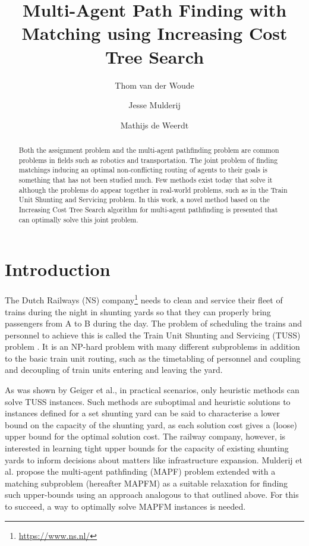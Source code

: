 \documentclass[english]{article}
\begin{document}
	
	\title{Multi-Agent Path Finding with Matching using Increasing Cost Tree Search}
	
	\author{Thom van der Woude\and Jesse Mulderij\and Mathijs de Weerdt}
	\date{}
	
	\maketitle
	
	\begin{abstract}
		Both the assignment problem and the multi-agent pathfinding problem are common problems in fields such as robotics and transportation. The joint problem of finding matchings inducing an optimal non-conflicting routing of agents to their goals is something that has not been studied much. Few methods exist today that solve it although the problems do appear together in real-world problems, such as in the Train Unit Shunting and Servicing problem. In this work, a novel method based on the Increasing Cost Tree Search algorithm for multi-agent pathfinding is presented that can optimally solve this joint problem.
	\end{abstract}
	
	\section{Introduction}
	The Dutch Railways (NS) company\footnote{\url{https://www.ns.nl/}} needs to clean and service their fleet of trains during the night in shunting yards so that they can properly bring passengers from A to B during the day. 
	The problem of scheduling the trains and personnel to achieve this is called the Train Unit Shunting and Servicing (TUSS) problem \cite{mulderij2020}. 
	It is an NP-hard problem with many different subproblems in addition to the basic train unit routing, such as the timetabling of personnel and coupling and decoupling of train units entering and leaving the yard. %
	
	As was shown by Geiger et al.\cite{geiger2018}, in practical scenarios, only heuristic methods can solve TUSS instances. 
	Such methods are suboptimal and heuristic solutions to instances defined for a set shunting yard can be said to characterise a lower bound on the capacity of the shunting yard, as each solution cost gives a (loose) upper bound for the optimal solution cost. 
	The railway company, however, is interested in learning tight upper bounds for the capacity of existing shunting yards to inform decisions about matters like infrastructure expansion. 
	Mulderij et al. \cite{mulderij2020} propose the multi-agent pathfinding (MAPF) problem \cite{stern2019} extended with a matching subproblem (hereafter MAPFM) as a suitable relaxation for finding such upper-bounds using an approach analogous to that outlined above.
	For this to succeed, a way to optimally solve MAPFM instances is needed.
	
\end{document}
